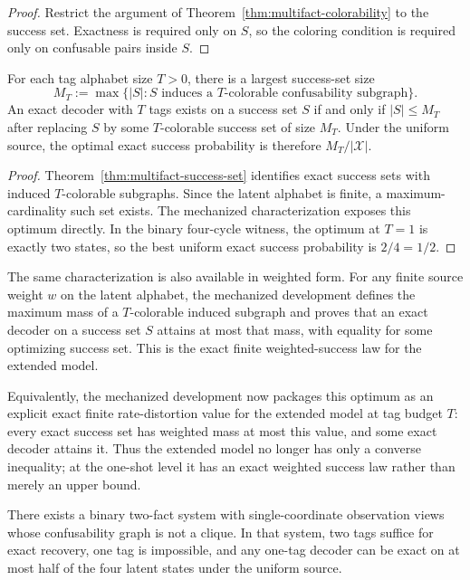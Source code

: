 \begin{proof}
Restrict the argument of Theorem~\ref{thm:multifact-colorability} to the success set. Exactness is required only on $S$, so the coloring condition is required only on confusable pairs inside $S$.
\end{proof}

\begin{theorem}\label{thm:multifact-max-success}
For each tag alphabet size $T>0$, there is a largest success-set size
\[
M_T := \max\{|S| : S \text{ induces a } T\text{-colorable confusability subgraph}\}.
\]
An exact decoder with $T$ tags exists on a success set $S$ if and only if $|S|\le M_T$ after replacing $S$ by some $T$-colorable success set of size $M_T$. Under the uniform source, the optimal exact success probability is therefore $M_T/|\mathcal X|$.
\end{theorem}

\begin{proof}
Theorem~\ref{thm:multifact-success-set} identifies exact success sets with induced $T$-colorable subgraphs. Since the latent alphabet is finite, a maximum-cardinality such set exists. The mechanized characterization exposes this optimum directly. In the binary four-cycle witness, the optimum at $T=1$ is exactly two states, so the best uniform exact success probability is $2/4=1/2$.
\end{proof}

The same characterization is also available in weighted form. For any finite source weight $w$ on the latent alphabet, the mechanized development defines the maximum mass of a $T$-colorable induced subgraph and proves that an exact decoder on a success set $S$ attains at most that mass, with equality for some optimizing success set. This is the exact finite weighted-success law for the extended model.

Equivalently, the mechanized development now packages this optimum as an explicit exact finite rate-distortion value for the extended model at tag budget $T$: every exact success set has weighted mass at most this value, and some exact decoder attains it. Thus the extended model no longer has only a converse inequality; at the one-shot level it has an exact weighted success law rather than merely an upper bound.

\begin{theorem}\label{thm:multifact-nonclique}
There exists a binary two-fact system with single-coordinate observation views whose confusability graph is not a clique. In that system, two tags suffice for exact recovery, one tag is impossible, and any one-tag decoder can be exact on at most half of the four latent states under the uniform source.
\end{theorem}

